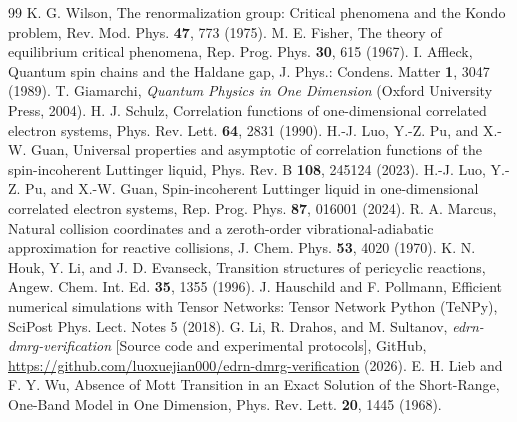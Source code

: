 \documentclass[prb,reprint,twocolumn,superscriptaddress]{revtex4-2}
\begin{document}
\begin{thebibliography}{99}
 K. G. Wilson, The renormalization group: Critical phenomena and the Kondo problem, Rev. Mod. Phys. \textbf{47}, 773 (1975).
 M. E. Fisher, The theory of equilibrium critical phenomena, Rep. Prog. Phys. \textbf{30}, 615 (1967).
 I. Affleck, Quantum spin chains and the Haldane gap, J. Phys.: Condens. Matter \textbf{1}, 3047 (1989).
 T. Giamarchi, \emph{Quantum Physics in One Dimension} (Oxford University Press, 2004).
 H. J. Schulz, Correlation functions of one-dimensional correlated electron systems, Phys. Rev. Lett. \textbf{64}, 2831 (1990).
 H.-J. Luo, Y.-Z. Pu, and X.-W. Guan, Universal properties and asymptotic of correlation functions of the spin-incoherent Luttinger liquid, Phys. Rev. B \textbf{108}, 245124 (2023).
 H.-J. Luo, Y.-Z. Pu, and X.-W. Guan, Spin-incoherent Luttinger liquid in one-dimensional correlated electron systems, Rep. Prog. Phys. \textbf{87}, 016001 (2024).
 R. A. Marcus, Natural collision coordinates and a zeroth-order vibrational-adiabatic approximation for reactive collisions, J. Chem. Phys. \textbf{53}, 4020 (1970).
 K. N. Houk, Y. Li, and J. D. Evanseck, Transition structures of pericyclic reactions, Angew. Chem. Int. Ed. \textbf{35}, 1355 (1996).
 J. Hauschild and F. Pollmann, Efficient numerical simulations with Tensor Networks: Tensor Network Python (TeNPy), SciPost Phys. Lect. Notes 5 (2018).
 G. Li, R. Drahos, and M. Sultanov, \emph{edrn-dmrg-verification} [Source code and experimental protocols], GitHub, \url{https://github.com/luoxuejian000/edrn-dmrg-verification} (2026).
 E. H. Lieb and F. Y. Wu, Absence of Mott Transition in an Exact Solution of the Short-Range, One-Band Model in One Dimension, Phys. Rev. Lett. \textbf{20}, 1445 (1968).
\end{thebibliography}
\end{document}
